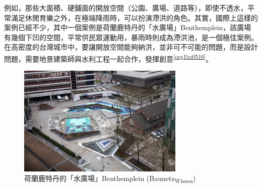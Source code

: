 \documentclass[a4paper,12pt]{article}
\begin{document}
例如，那些大面積、硬鋪面的開放空間（公園、廣場、道路等），即使不透水，平常滿足休閒育樂之外，在極端降雨時，可以扮演滯洪的角色。其實，國際上這樣的案例已經不少，其中一個案例是荷蘭鹿特丹的「水廣場」Benthemplein，該廣場有幾個下凹的空間，平常供民眾運動用，暴雨時則成為滯洪池，是一個極佳案例。在高密度的台灣城市中，要讓開放空間能夠納洪，並非可不可能的問題，而是設計問題，需要地景建築師與水利工程一起合作，發揮創意\textsuperscript{\ref{org1ba0516}}。\\

\begin{figure}[htbp]
\centering
\includegraphics[width=300]{images/161236830025147_P3592665.jpg}
\caption{\label{fig:Benthemplein}荷蘭鹿特丹的「水廣場」Benthemplein (Baunetz\textsubscript{Wissen})}
\end{figure}
\newpage
\end{document}
